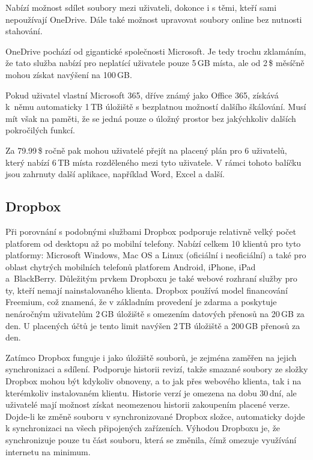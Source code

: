 \documentclass[
  glossaries,
]{kidiplom}
\begin{document}
Nabízí možnost sdílet soubory mezi uživateli, dokonce i s těmi, kteří sami nepoužívají OneDrive. Dále také možnost upravovat soubory online bez nutnosti stahování.

OneDrive pochází od gigantické společnosti Microsoft. Je tedy trochu zklamáním, že tato služba nabízí pro neplatící uživatele pouze 5\,GB místa, ale od 2\,\$ měsíčně mohou získat navýšení na 100\,GB.

Pokud uživatel vlastní Microsoft 365, dříve známý jako Office 365, získává k~němu automaticky 1\,TB úložiště s bezplatnou možností dalšího škálování. Musí mít však na paměti, že se jedná pouze o úložný prostor bez jakýchkoliv dalších pokročilých funkcí.

Za 79.99\,\$ ročně pak mohou uživatelé přejít na placený plán pro 6 uživatelů, který nabízí 6\,TB místa rozděleného mezi tyto uživatele. V rámci tohoto balíčku jsou zahrnuty další aplikace, například Word, Excel a další. \cite{ONEDRIVE}

\subsection{Dropbox}
Při porovnání s podobnými službami Dropbox podporuje relativně velký počet platforem od desktopu až po mobilní telefony. Nabízí celkem 10 klientů pro tyto platformy: Microsoft Windows, Mac OS a Linux (oficiální i neoficiální) a také pro oblast chytrých mobilních telefonů platforem Android, iPhone, iPad a~\mbox{BlackBerry}. Důležitým prvkem Dropboxu je také webové rozhraní služby pro ty, kteří nemají nainstalovaného klienta. Dropbox používá model financování Freemium, což znamená, že v základním provedení je zdarma a poskytuje nenáročným uživatelům 2\,GB úložiště s omezením datových přenosů na 20\,GB za den. U placených účtů je tento limit navýšen 2\,TB úložiště a 200\,GB přenosů za den. \cite{DROPBOX}

Zatímco Dropbox funguje i jako úložiště souborů, je zejména zaměřen na jejich synchronizaci a sdílení. Podporuje historii revizí, takže smazané soubory ze složky Dropbox mohou být kdykoliv obnoveny, a to jak přes webového klienta, tak i na kterémkoliv instalovaném klientu. Historie verzí je omezena na dobu 30\,dní, ale uživatelé mají možnost získat neomezenou historii zakoupením placené verze. Dojde-li ke změně souboru v synchronizované Dropbox složce, automaticky dojde k synchronizaci na všech připojených zařízeních. Výhodou Dropboxu je, že synchronizuje pouze tu část souboru, která se změnila, čímž omezuje využívání internetu na minimum. \cite{DROPBOX}
\end{document}
